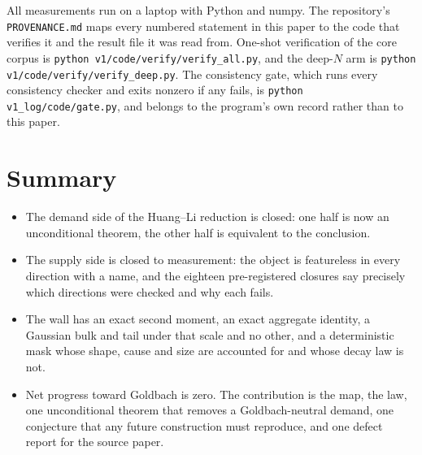 \documentclass[11pt,a4paper]{article}
\theoremstyle{plain}
\theoremstyle{definition}
\begin{document}
All measurements run on a laptop with Python and numpy. The
repository's \texttt{PROVENANCE.md} maps every numbered statement in
this paper to the code that verifies it and the result file it was
read from. One-shot verification of the core corpus is
\texttt{python v1/code/verify/verify\_all.py}, and the deep-$N$ arm is
\texttt{python v1/code/verify/verify\_deep.py}. The consistency gate, which runs
every consistency checker and exits nonzero if any fails, is
\texttt{python v1\_log/code/gate.py}, and belongs to the program's
own record rather than to this paper.

\section{Summary}

\begin{itemize}
\item The demand side of the Huang--Li reduction is closed: one half
  is now an unconditional theorem, the other half is equivalent to the
  conclusion.
\item The supply side is closed to measurement: the object is
  featureless in every direction with a name, and the eighteen
  pre-registered closures say precisely which directions were checked
  and why each fails.
\item The wall has an exact second moment, an exact aggregate identity,
  a Gaussian bulk and tail under that scale and no other, and a
  deterministic mask whose shape, cause and size are accounted for and
  whose decay law is not.
\item Net progress toward Goldbach is zero. The contribution is the
  map, the law, one unconditional theorem that removes a
  Goldbach-neutral demand, one conjecture that any future construction
  must reproduce, and one defect report for the source paper.
\end{itemize}
\end{document}
